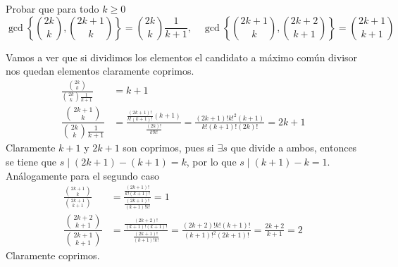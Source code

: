\documentclass[twoside]{article}
\begin{document}
\begin{ejercicio}{2}
Probar que para todo $k\geq 0$
\[
\gcd \left\{\binom{2k}{k},\binom{2k+1}{k}\right\}=\binom{2k}{k}\frac{1}{k+1}, \quad \gcd \left\{\binom{2k+1}{k},\binom{2k+2}{k+1}\right\}=\binom{2k+1}{k+1}
\]
\begin{sol}
Vamos a ver que si dividimos los elementos el candidato a máximo común divisor nos quedan elementos claramente coprimos.
\begin{align*}
\frac{\binom{2k}{k}}{\binom{2k}{k}\frac{1}{k+1}}&=k+1\\
\dfrac{\binom{2k+1}{k}}{\binom{2k}{k}\frac{1}{k+1}}&=\frac{\frac{(2k+1)!}{k!(k+1)!}(k+1)}{\frac{(2k)!}{k!k!}} = \frac{(2k+1)!k!^2(k+1)}{k!(k+1)!(2k)!}=2k+1
\end{align*}
Claramente $k+1$ y $2k+1$ son coprimos, pues si $\exists s$ que divide a ambos, entonces se tiene que $s\mid (2k+1)-(k+1) = k$, por lo que $s \mid (k+1)-k =1$. Análogamente para el segundo caso
\begin{align*}
\frac{\binom{2k+1}{k}}{\binom{2k+1}{k+1}}&=\frac{\frac{(2k+1)!}{k!(k+1)!}}{\frac{(2k+1)!}{(k+1)!k!}}=1\\
\dfrac{\binom{2k+2}{k+1}}{\binom{2k+1}{k+1}}&=\frac{\frac{(2k+2)!}{(k+1)!(k+1)!}}{\frac{(2k+1)!}{(k+1)!k!}} = \frac{(2k+2)!k!(k+1)!}{(k+1)!^2(2k+1)!}=\frac{2k+2}{k+1}=2
\end{align*}
Claramente coprimos.
\end{sol}
\end{ejercicio}


\newpage
\end{document}
